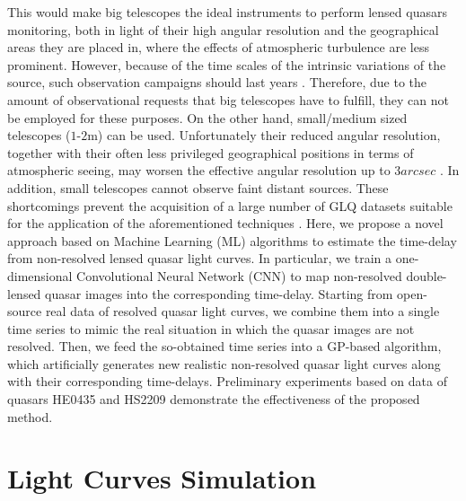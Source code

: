 \documentclass{aa}
\begin{document}
This would make big telescopes the ideal instruments to perform lensed quasars monitoring, both in light of their high angular resolution and the geographical areas they are placed in, where the effects of atmospheric turbulence are less prominent.
However, because of the time scales of the intrinsic variations of the source, such observation campaigns should last years \cite{Cosmograil2020}. Therefore, due to the amount of observational requests that big telescopes have to fulfill, they can not be employed for these purposes. On the other hand, small/medium sized telescopes ($1$-$2$m) \cite{Borgeest1996} can be used. Unfortunately their reduced angular resolution, together with their often less privileged geographical positions in terms of atmospheric seeing, may worsen the effective angular resolution up to $3 arcsec$ \cite{karttunen2016fundamental}. In addition, small telescopes cannot observe faint distant sources. These shortcomings prevent the acquisition of a large number of GLQ datasets suitable for the application of the aforementioned techniques \cite{free, Rasmussen}.
Here, we propose a novel approach based on Machine Learning (ML) algorithms to estimate the time-delay from non-resolved lensed quasar light curves. In particular, we train a one-dimensional Convolutional Neural Network (CNN) to map non-resolved double-lensed quasar images into the corresponding time-delay. Starting from open-source real data \cite{CosmograilData} of resolved quasar light curves, we combine them into a single time series to mimic the real situation in which the quasar images are not resolved. Then, we feed the so-obtained time series into a GP-based algorithm, which artificially generates new realistic non-resolved quasar light curves along with their corresponding time-delays. Preliminary experiments based on data of quasars HE0435 and HS2209 demonstrate the effectiveness of the proposed method.

   
\section{Light Curves Simulation}
\end{document}
